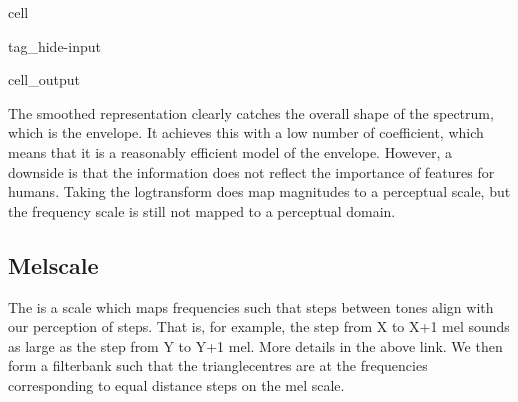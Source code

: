 \documentclass[letterpaper,10pt,english]{jupyterBook}
\begin{document}
\begin{sphinxuseclass}{cell}
\begin{sphinxuseclass}{tag_hide-input}\begin{sphinxVerbatimOutput}

\begin{sphinxuseclass}{cell_output}
\noindent{}

\noindent{}

\noindent{}

\noindent{}

\end{sphinxuseclass}\end{sphinxVerbatimOutput}

\end{sphinxuseclass}
\end{sphinxuseclass}
\sphinxAtStartPar
The smoothed representation clearly catches the overall shape of the spectrum, which is the envelope. It achieves this with a low number of coefficient, which means that it is a reasonably efficient model of the envelope. However, a downside is that the information does not reflect the importance of features for humans. Taking the log\sphinxhyphen{}transform does map magnitudes to a perceptual scale, but the frequency scale is still not mapped to a perceptual domain.


\subsection{Mel\sphinxhyphen{}scale}
\label{\detokenize{Representations/Melcepstrum:mel-scale}}
\sphinxAtStartPar
The  is a scale which maps frequencies such that steps between tones align with our perception of steps. That is, for example, the step from X to X+1 mel sounds as large as the step from Y to Y+1 mel. More details in the above link.
We then form a filterbank such that the triangle\sphinxhyphen{}centres are at the frequencies corresponding to equal distance steps on the mel scale.
\end{document}
